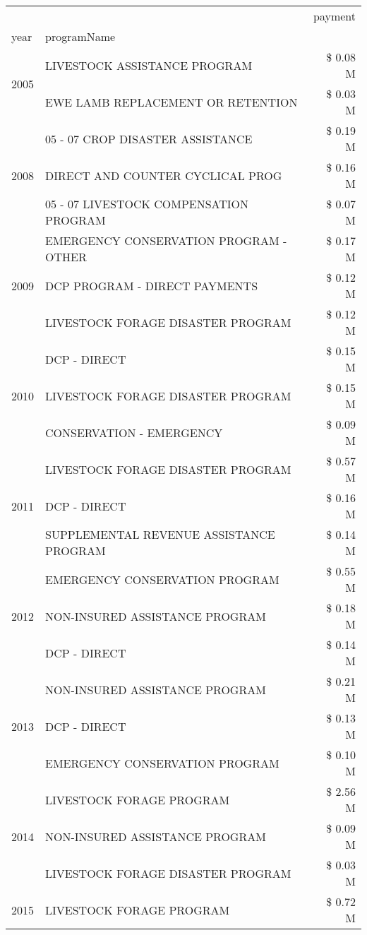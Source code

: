 \begin{tabular}{llr}
\toprule
 &  & payment \\
year & programName &  \\
\midrule
\multirow[t]{2}{*}{2005} & LIVESTOCK ASSISTANCE PROGRAM & \$ 0.08 M \\
 & EWE LAMB REPLACEMENT OR RETENTION & \$ 0.03 M \\
\cline{1-3}
\multirow[t]{3}{*}{2008} & 05 - 07 CROP DISASTER ASSISTANCE & \$ 0.19 M \\
 & DIRECT AND COUNTER CYCLICAL PROG & \$ 0.16 M \\
 & 05 - 07 LIVESTOCK COMPENSATION PROGRAM & \$ 0.07 M \\
\cline{1-3}
\multirow[t]{3}{*}{2009} & EMERGENCY CONSERVATION PROGRAM - OTHER & \$ 0.17 M \\
 & DCP PROGRAM - DIRECT PAYMENTS & \$ 0.12 M \\
 & LIVESTOCK FORAGE DISASTER  PROGRAM & \$ 0.12 M \\
\cline{1-3}
\multirow[t]{3}{*}{2010} & DCP - DIRECT & \$ 0.15 M \\
 & LIVESTOCK FORAGE DISASTER PROGRAM & \$ 0.15 M \\
 & CONSERVATION - EMERGENCY & \$ 0.09 M \\
\cline{1-3}
\multirow[t]{3}{*}{2011} & LIVESTOCK FORAGE DISASTER PROGRAM & \$ 0.57 M \\
 & DCP - DIRECT & \$ 0.16 M \\
 & SUPPLEMENTAL REVENUE ASSISTANCE PROGRAM & \$ 0.14 M \\
\cline{1-3}
\multirow[t]{3}{*}{2012} & EMERGENCY CONSERVATION PROGRAM & \$ 0.55 M \\
 & NON-INSURED ASSISTANCE PROGRAM & \$ 0.18 M \\
 & DCP - DIRECT & \$ 0.14 M \\
\cline{1-3}
\multirow[t]{3}{*}{2013} & NON-INSURED ASSISTANCE PROGRAM & \$ 0.21 M \\
 & DCP - DIRECT & \$ 0.13 M \\
 & EMERGENCY CONSERVATION PROGRAM & \$ 0.10 M \\
\cline{1-3}
\multirow[t]{3}{*}{2014} & LIVESTOCK FORAGE PROGRAM & \$ 2.56 M \\
 & NON-INSURED ASSISTANCE PROGRAM & \$ 0.09 M \\
 & LIVESTOCK FORAGE DISASTER PROGRAM & \$ 0.03 M \\
\cline{1-3}
\multirow[t]{3}{*}{2015} & LIVESTOCK FORAGE PROGRAM & \$ 0.72 M \\

\end{tabular}
